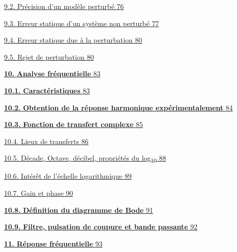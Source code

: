 \protect\hyperlink{pruxe9cision-dun-moduxe8le-perturbuxe9}{9.2. Précision d'un modèle perturbé \protect\hyperlink{pruxe9cision-dun-moduxe8le-perturbuxe9}{76}}

\protect\hyperlink{erreur-statique-dun-systuxe8me-non-perturbuxe9}{9.3. Erreur statique d'un système non perturbé \protect\hyperlink{erreur-statique-dun-systuxe8me-non-perturbuxe9}{77}}

\protect\hyperlink{erreur-statique-due-uxe0-la-perturbation}{9.4. Erreur statique due à la perturbation \protect\hyperlink{erreur-statique-due-uxe0-la-perturbation}{80}}

\protect\hyperlink{rejet-de-perturbation}{9.5. Rejet de perturbation \protect\hyperlink{rejet-de-perturbation}{80}}

\protect\hyperlink{_Toc149497272}{\textbf{10.} \textbf{Analyse fréquentielle} \protect\hyperlink{_Toc149497272}{83}}

\protect\hyperlink{_Toc337686831}{\textbf{10.1.} \textbf{Caractéristiques} \protect\hyperlink{_Toc337686831}{83}}

\protect\hyperlink{_Toc272749600}{\textbf{10.2.} \textbf{Obtention de la réponse harmonique expérimentalement} \protect\hyperlink{_Toc272749600}{84}}

\protect\hyperlink{_Toc387521156}{\textbf{10.3.} \textbf{Fonction de transfert complexe} \protect\hyperlink{_Toc387521156}{85}}

\protect\hyperlink{lieux-de-transferts}{10.4. Lieux de transferts \protect\hyperlink{lieux-de-transferts}{86}}

\protect\hyperlink{duxe9cade-octave-duxe9cibel-propriuxe9tuxe9s-du-log10}{10.5. Décade, Octave, décibel, propriétés du log\textsubscript{10} \protect\hyperlink{duxe9cade-octave-duxe9cibel-propriuxe9tuxe9s-du-log10}{88}}

\protect\hyperlink{intuxe9ruxeat-de-luxe9chelle-logarithmique}{10.6. Intérêt de l'échelle logarithmique \protect\hyperlink{intuxe9ruxeat-de-luxe9chelle-logarithmique}{89}}

\protect\hyperlink{gain-et-phase}{10.7. Gain et phase \protect\hyperlink{gain-et-phase}{90}}

\protect\hyperlink{_Toc387521153}{\textbf{10.8.} \textbf{Définition du diagramme de Bode} \protect\hyperlink{_Toc387521153}{91}}

\protect\hyperlink{_Toc494227256}{\textbf{10.9.} \textbf{Filtre, pulsation de coupure et bande passante} \protect\hyperlink{_Toc494227256}{92}}

\protect\hyperlink{_Toc494227260}{\textbf{11.} \textbf{Réponse fréquentielle} \protect\hyperlink{_Toc494227260}{93}}

